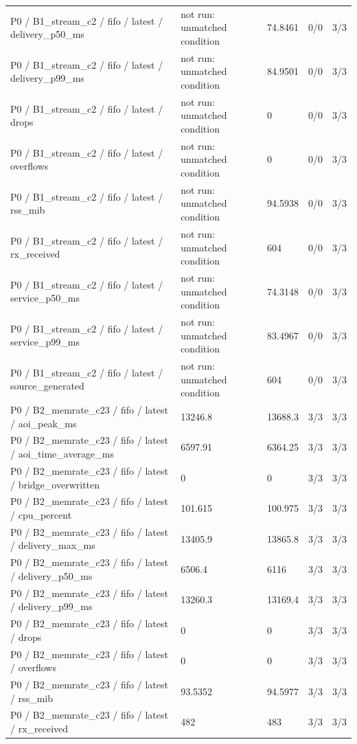 \begin{tabular}{@{}lllll@{}}
P0 / B1\_stream\_c2 / fifo / latest / delivery\_p50\_ms & not run: unmatched condition & 74.8461 & 0/0 & 3/3 \\
P0 / B1\_stream\_c2 / fifo / latest / delivery\_p99\_ms & not run: unmatched condition & 84.9501 & 0/0 & 3/3 \\
P0 / B1\_stream\_c2 / fifo / latest / drops & not run: unmatched condition & 0 & 0/0 & 3/3 \\
P0 / B1\_stream\_c2 / fifo / latest / overflows & not run: unmatched condition & 0 & 0/0 & 3/3 \\
P0 / B1\_stream\_c2 / fifo / latest / rss\_mib & not run: unmatched condition & 94.5938 & 0/0 & 3/3 \\
P0 / B1\_stream\_c2 / fifo / latest / rx\_received & not run: unmatched condition & 604 & 0/0 & 3/3 \\
P0 / B1\_stream\_c2 / fifo / latest / service\_p50\_ms & not run: unmatched condition & 74.3148 & 0/0 & 3/3 \\
P0 / B1\_stream\_c2 / fifo / latest / service\_p99\_ms & not run: unmatched condition & 83.4967 & 0/0 & 3/3 \\
P0 / B1\_stream\_c2 / fifo / latest / source\_generated & not run: unmatched condition & 604 & 0/0 & 3/3 \\
P0 / B2\_memrate\_c23 / fifo / latest / aoi\_peak\_ms & 13246.8 & 13688.3 & 3/3 & 3/3 \\
P0 / B2\_memrate\_c23 / fifo / latest / aoi\_time\_average\_ms & 6597.91 & 6364.25 & 3/3 & 3/3 \\
P0 / B2\_memrate\_c23 / fifo / latest / bridge\_overwritten & 0 & 0 & 3/3 & 3/3 \\
P0 / B2\_memrate\_c23 / fifo / latest / cpu\_percent & 101.615 & 100.975 & 3/3 & 3/3 \\
P0 / B2\_memrate\_c23 / fifo / latest / delivery\_max\_ms & 13405.9 & 13865.8 & 3/3 & 3/3 \\
P0 / B2\_memrate\_c23 / fifo / latest / delivery\_p50\_ms & 6506.4 & 6116 & 3/3 & 3/3 \\
P0 / B2\_memrate\_c23 / fifo / latest / delivery\_p99\_ms & 13260.3 & 13169.4 & 3/3 & 3/3 \\
P0 / B2\_memrate\_c23 / fifo / latest / drops & 0 & 0 & 3/3 & 3/3 \\
P0 / B2\_memrate\_c23 / fifo / latest / overflows & 0 & 0 & 3/3 & 3/3 \\
P0 / B2\_memrate\_c23 / fifo / latest / rss\_mib & 93.5352 & 94.5977 & 3/3 & 3/3 \\
P0 / B2\_memrate\_c23 / fifo / latest / rx\_received & 482 & 483 & 3/3 & 3/3 \\

\end{tabular}
